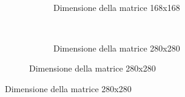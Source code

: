 \begin{figure}[p]
\begin{subfigure}[b]{.5\columnwidth}
    ~
    \begin{subfigure}[b]{\textwidth}
      \centering
      \addtocounter{subfigure}{-1}
      \renewcommand\thesubfigure{\alph{subfigure}2}
      \resizebox{\columnwidth}{!}{}
      \caption{Dimensione della matrice 168x168}
      \label{fig:compare_s_sm_168}
    \end{subfigure}
    ~
    \begin{subfigure}[b]{\textwidth}
      \centering
      \addtocounter{subfigure}{-1}
      \renewcommand\thesubfigure{\alph{subfigure}3}
      \resizebox{\columnwidth}{!}{}
      \caption{Dimensione della matrice 280x280}
      \label{fig:compare_s_sm_280}
    \end{subfigure}
    \label{fig:compare_s_sm}
  \end{subfigure}
  \label{fig:compare}
\end{figure}





